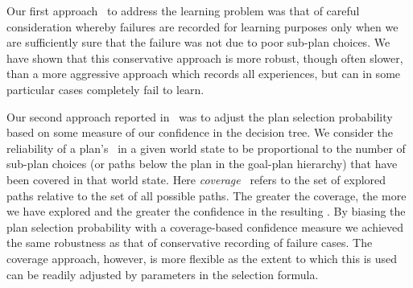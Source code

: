 

Our first approach~\cite{Airiau:IJAT:09} to address the learning problem was that 
of careful consideration whereby failures are recorded for learning purposes 
only when we are sufficiently sure that the failure was not due to poor
sub-plan choices. 
We have shown that this conservative approach is more robust, 
though often slower, than a more aggressive
approach which records all experiences, but can in some particular cases
completely fail to learn.

Our second approach reported in~\cite{Singh:AAMAS10} was to
adjust the plan selection probability based on some measure of 
our confidence in the decision tree.
%
We consider the reliability of a plan's \dt\ in a given 
world state to be proportional to the number of sub-plan choices (or paths
below the plan in the goal-plan hierarchy) that have been
covered in that world state. 
%
Here {\it coverage}~\cite{Singh:AAMAS10} refers to the set of explored paths relative to the set of all possible paths.
%
The greater the coverage, the more we have explored and the greater the confidence in the resulting \dt.
%
By biasing the plan selection probability with a coverage-based confidence
measure we achieved the same robustness as that of conservative recording of 
failure cases. The coverage approach, however, is more 
flexible as the extent to which this is used can be
readily adjusted by parameters in the selection formula. 

